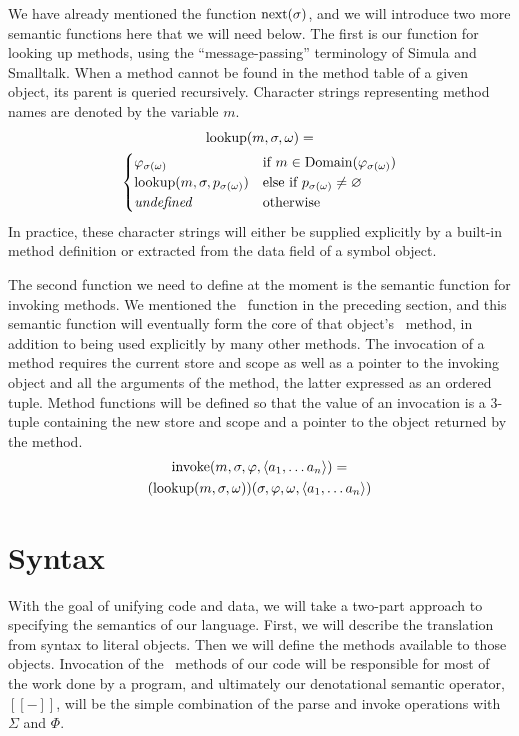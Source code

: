 \documentclass[twocolumn]{article}
\begin{document}
We have already mentioned the function $\operatorname{next}(\sigma)$, and we will
introduce two more semantic functions here that we will need
below. The first is our function for looking up methods, using the
``message-passing'' terminology of Simula and Smalltalk. When a method
cannot be found in the method table of a given object, its parent is
queried recursively. Character strings representing method names are
denoted by the variable $m$.
\begin{multline*} \operatorname{lookup}(m, \sigma, \omega) = \\
\begin{cases}
  \varphi_{\sigma(\omega)} &\text{if } m \in
  \operatorname{Domain}(\varphi_{\sigma(\omega)}) \\
  \operatorname{lookup}(m,\sigma,p_{\sigma(\omega)})
  &\text{else if }p_{\sigma(\omega)}\neq \varnothing\\
  \mathit{undefined} & \text {otherwise}
  \end{cases}
\end{multline*}
In practice, these character strings will either be supplied
explicitly by a built-in method definition or extracted from the data
field of a symbol object.

The second function we need to define at the moment is the semantic
function for invoking methods. We mentioned the \msg\ function in the
preceding section, and this semantic function will eventually form the
core of that object's \call\ method, in addition to being used
explicitly by many other methods. The invocation of a method requires
the current store and scope as well as a pointer to the invoking
object and all the arguments of the method, the latter expressed as an
ordered tuple. Method functions will be defined so that the value of
an invocation is a 3-tuple containing the new store and scope and a
pointer to the object returned by the method.
\begin{multline*}
  \operatorname{invoke}( m, \sigma, \varphi, \left< a_1,\ldots a_n\right>) = \\
  (\operatorname{lookup}(m, \sigma, \omega))(\sigma,\varphi,\omega,
  \left< a_1,\ldots a_n \right> )
\end{multline*}
  
\section*{Syntax}

With the goal of unifying code and data, we will take a two-part
approach to specifying the semantics of our language. First, we will
describe the translation from syntax to literal objects. Then we will
define the methods available to those objects. Invocation of the
\eval\ methods of our code will be responsible for most of the work
done by a program, and ultimately our denotational semantic operator,
$[\![-]\!]$, will be the simple combination of the parse and invoke
operations with $\Sigma$ and $\Phi$.
\end{document}
